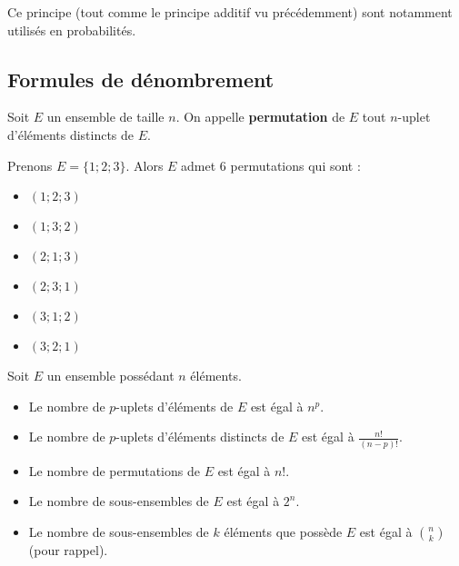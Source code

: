 	Ce principe (tout comme le principe additif vu précédemment) sont notamment utilisés en probabilités.
	
	\subsection{Formules de dénombrement}
	
	\begin{formula}[Permutations]
		Soit $E$ un ensemble de taille $n$. On appelle \textbf{permutation} de $E$ tout $n$-uplet d'éléments distincts de $E$.
	\end{formula}
	
	\begin{tip}[Exemple]
		Prenons $E = \{1; 2; 3\}$. Alors $E$ admet $6$ permutations qui sont :
		\begin{itemize}
			\item $(1; 2; 3)$
			\item $(1; 3; 2)$
			\item $(2; 1; 3)$
			\item $(2; 3; 1)$
			\item $(3; 1; 2)$
			\item $(3; 2; 1)$
		\end{itemize}
	\end{tip}
	
	\begin{formula}[Formules]
		Soit $E$ un ensemble possédant $n$ éléments.
		\begin{itemize}
			\item Le nombre de $p$-uplets d'éléments de $E$ est égal à $n^p$.
			\item Le nombre de $p$-uplets d'éléments distincts de $E$ est égal à $\frac{n!}{(n-p)!}$.
			\item Le nombre de permutations de $E$ est égal à $n!$.
			\item Le nombre de sous-ensembles de $E$ est égal à $2^n$.
			\item Le nombre de sous-ensembles de $k$ éléments que possède $E$ est égal à $\binom{n}{k}$ (pour rappel).
		\end{itemize}
	\end{formula}
	
